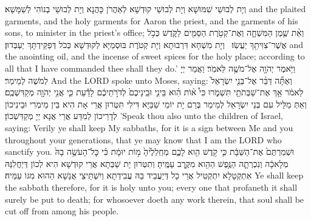 {{וְיָת לְבוּשֵׁי שִׁמּוּשָׁא וְיָת לְבוּשֵׁי קוּדְשָׁא לְאַהֲרֹן כָּהֲנָא וְיָת לְבוּשֵׁי בְנוֹהִי לְשַׁמָּשָׁא׃}
{and the plaited garments, and the holy garments for Aaron the priest, and the garments of his sons, to minister in the priest’s office;}{}
{וְאֵ֨ת שֶׁ֧מֶן הַמִּשְׁחָ֛ה וְאֶת־קְטֹ֥רֶת הַסַּמִּ֖ים לַקֹּ֑דֶשׁ כְּכֹ֥ל אֲשֶׁר־צִוִּיתִ֖ךָ יַעֲשֽׂוּ׃ \petucha 
{}}
{וְיָת מִשְׁחָא דִּרְבוּתָא וְיָת קְטֹרֶת בּוּסְמַיָּא לְקוּדְשָׁא כְּכֹל דְּפַקֵּידְתָּךְ יַעְבְּדוּן׃}
{and the anointing oil, and the incense of sweet spices for the holy place; according to all that I have commanded thee shall they do.’}{}
{וַיֹּ֥אמֶר יְהֹוָ֖ה אֶל־מֹשֶׁ֥ה לֵּאמֹֽר׃}
{וַאֲמַר יְיָ לְמֹשֶׁה לְמֵימַר׃}
{And the LORD spoke unto Moses, saying:}{}
{וְאַתָּ֞ה דַּבֵּ֨ר אֶל־בְּנֵ֤י יִשְׂרָאֵל֙ לֵאמֹ֔ר אַ֥ךְ אֶת־שַׁבְּתֹתַ֖י תִּשְׁמֹ֑רוּ כִּי֩ א֨וֹת הִ֜וא בֵּינִ֤י וּבֵֽינֵיכֶם֙ לְדֹרֹ֣תֵיכֶ֔ם לָדַ֕עַת כִּ֛י אֲנִ֥י יְהֹוָ֖ה מְקַדִּשְׁכֶֽם׃
}
{וְאַתְּ מַלֵּיל עִם בְּנֵי יִשְׂרָאֵל לְמֵימַר בְּרַם יָת יוֹמֵי שַׁבַּיָּא דִּילִי תִּטְּרוּן אֲרֵי אָת הִיא בֵּין מֵימְרִי וּבֵינֵיכוֹן לְדָרֵיכוֹן לְמִדַּע אֲרֵי אֲנָא יְיָ מְקַדִּשְׁכוֹן׃}
{’Speak thou also unto the children of Israel, saying: Verily ye shall keep My sabbaths, for it is a sign between Me and you throughout your generations, that ye may know that I am the LORD who sanctify you.}{}
{וּשְׁמַרְתֶּם֙ אֶת־הַשַּׁבָּ֔ת כִּ֛י קֹ֥דֶשׁ הִ֖וא לָכֶ֑ם מְחַֽלְלֶ֙יהָ֙ מ֣וֹת יוּמָ֔ת כִּ֗י כׇּל־הָעֹשֶׂ֥ה בָהּ֙ מְלָאכָ֔ה וְנִכְרְתָ֛ה הַנֶּ֥פֶשׁ הַהִ֖וא מִקֶּ֥רֶב עַמֶּֽיהָ׃
}
{וְתִטְּרוּן יָת שַׁבְּתָא אֲרֵי קוּדְשָׁא הִיא לְכוֹן דְּיַחֲלִנַּהּ אִתְקְטָלָא יִתְקְטִיל אֲרֵי כָל דְּיַעֲבֵיד בַּהּ עֲבִידְתָא וְיִשְׁתֵּיצֵי אֲנָשָׁא הַהוּא מִגּוֹ עַמֵּיהּ׃}
{Ye shall keep the sabbath therefore, for it is holy unto you; every one that profaneth it shall surely be put to death; for whosoever doeth any work therein, that soul shall be cut off from among his people.}{}
}
